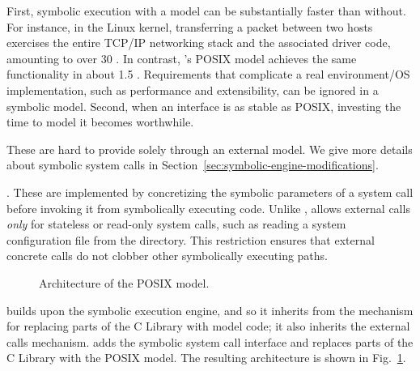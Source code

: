  First, symbolic execution with a model can be substantially faster than without.  For instance, in the Linux kernel, transferring a packet between two hosts exercises the entire TCP/IP networking stack and the associated driver code, amounting to over 30 \kloc.  In contrast, \cnine's POSIX model achieves the same functionality in about 1.5 \kloc. Requirements that complicate a real environment/OS implementation, such as performance and extensibility, can be ignored in a symbolic model. Second, when an interface is as stable as POSIX, investing the time to model it becomes worthwhile.

  These are hard to provide solely through an external model. We give more details about symbolic system calls in Section~\ref{sec:symbolic-engine-modifications}.

.  These are implemented by concretizing the symbolic parameters of a system call before invoking it from symbolically executing code. Unlike \cite{dart,klee,exe}, \cnine allows external calls \emph{only} for stateless or read-only system calls, such as reading a system configuration file from the  directory.  This restriction ensures that external concrete calls do not clobber other symbolically executing paths.

\begin{figure}[h!]
  \centering
  \caption{Architecture of the \cnine POSIX model.}
  \label{fig:posixmodel}
\end{figure}

\cnine builds upon the \klee symbolic execution engine, and so it inherits from \klee the mechanism for replacing parts of the C Library with model code; it also inherits the external calls mechanism.  \cnine adds the symbolic system call interface and replaces parts of the C Library with the POSIX model.  The resulting architecture is shown in Fig.~\ref{fig:posixmodel}.

\newcommand{\cI}{\!{\raisebox{-0.2ex}{\large\ding{192}}}\xspace}
\newcommand{\cII}{\!{\raisebox{-0.2ex}{\large\ding{193}}}\xspace}
\newcommand{\cIII}{\!{\raisebox{-0.2ex}{\large\ding{194}}}\xspace}
\newcommand{\cIV}{\!{\raisebox{-0.2ex}{\large\ding{195}}}\xspace}
\newcommand{\cV}{\!{\raisebox{-0.2ex}{\large\ding{196}}}\xspace}
\newcommand{\cVI}{\!{\raisebox{-0.2ex}{\large\ding{197}}}\xspace}
\newcommand{\cVII}{\!{\raisebox{-0.2ex}{\large\ding{198}}}\xspace}
\newcommand{\cVIII}{\!{\raisebox{-0.2ex}{\large\ding{199}}}\xspace}

